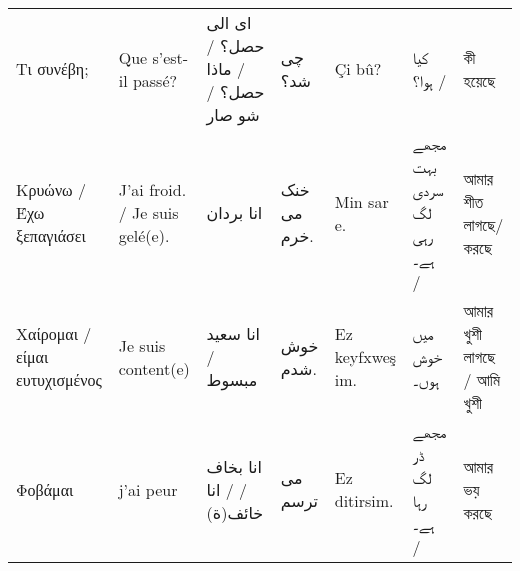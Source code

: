 \begin{longtable}{p{3.5cm} p{3.5cm} p{3.5cm} p{3.5cm} p{3.5cm} p{3.5cm} p{3.5cm} }
 Τι συνέβη;                                                                                                                    & Que s'est-il passé?                                                                             & ای الی حصل؟ /  / ماذا حصل؟           /  شو صار                                        & چی شد؟                                                      & Çi bû?                                                                             & کیا ہوا؟ /                                                                     & কী হয়েছে                                                          \\
 Κρυώνω / Έχω ξεπαγιάσει                                                                                                       & J'ai froid. / Je suis gelé(e).                                                                  & انا بردان                                                                             & خنک می خرم.                                                 & Min sar e.                                                                         & مجھے بہت سردی لگ رہی ہے۔  /                                                    & আমার শীত লাগছে/করছে                                               \\
 Χαίρομαι / είμαι ευτυχισμένος                                                                                                 & Je suis content(e)                                                                              & انا سعید                 / مبسوط                                                      & خوش شدم.                                                    & Ez keyfxweş im.                                                                    & میں خوش ہوں۔                                                                   & আমার খুশী লাগছে / আমি খুশী                                        \\
 Φοβάμαι                                                                                                                       & j'ai peur                                                                                       & انا بخاف  /  / انا خائف(ة)                                                            & می ترسم                                                     & Ez ditirsim.                                                                       & مجھے ڈر لگ رہا ہے۔ /                                                           & আমার ভয় করছে                                                      \\

\end{longtable}
